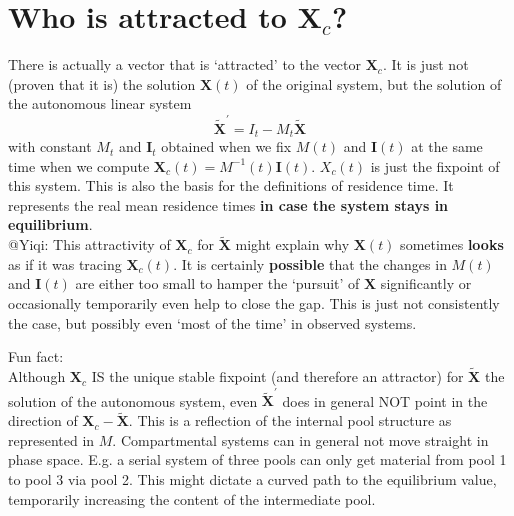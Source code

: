 \documentclass{article}
\newcommand{\X}{\mathbf{X}}
\newcommand{\I}{\mathbf{I}}
\begin{document}
\section{Who is attracted to $\X_c$?}
There is actually a vector that is `attracted' to the vector $\X_c$. It is just not (proven that it is) the solution $\X(t)$ of the original system, but the solution of the autonomous linear system 
$$
\tilde{\X}^{\prime} = I_t - M_t \tilde{\X}
$$ 
with constant $M_t$ and $\I_t$  obtained
when we fix $M(t)$ and $\I(t)$ at the same time when we compute $\X_c(t)=M^{-1}(t)\I(t)$.
$X_c(t)$ is just the fixpoint of this system. 
This is also the basis for the definitions of residence time. It represents the real mean residence times {\bf in case the system stays in equilibrium}. 
\\
@Yiqi:
This attractivity of $\X_c$ for $\tilde{\X}$ might explain why $\X(t)$ sometimes {\bf looks} as if it was tracing $\X_c(t)$.
It is certainly {\bf possible} that the changes in $M(t)$ and $\I(t)$ are either too small to hamper the `pursuit' of $\X$ significantly or occasionally temporarily even help to close the gap.
This is just not consistently the case, but possibly even `most of the time' in observed systems.

Fun fact:\\
Although $\X_c$ IS the unique stable fixpoint (and therefore an attractor) for $\tilde{\X}$ the  solution of the autonomous system, even $\tilde{\X}^{\prime}$ does in general NOT point in the direction of $\X_c-\tilde{\X}$. This is a reflection of the internal pool structure as represented in  $M$. Compartmental systems can in general not move straight in phase space.   
E.g. a serial system of three pools can only get material from pool 1 to pool 3 via pool 2. This might dictate a curved path to the equilibrium value, temporarily increasing the content of the
intermediate pool.
\end{document}
